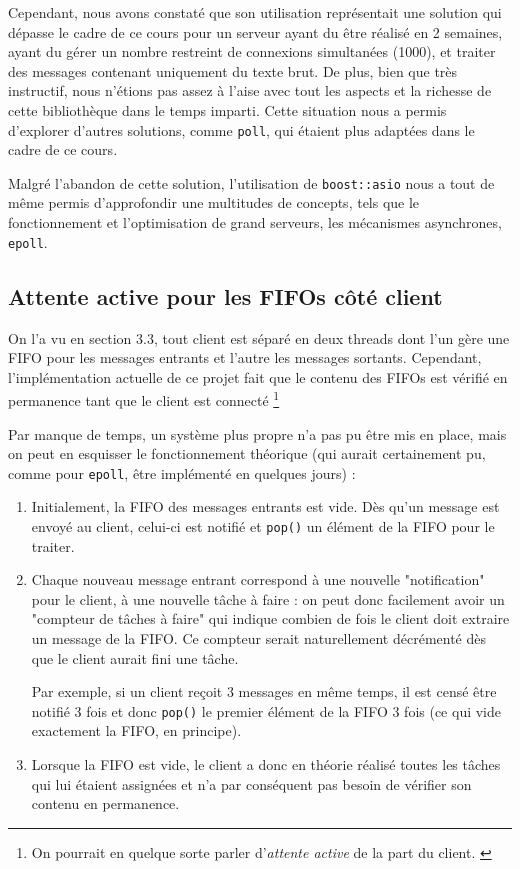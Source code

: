 \documentclass{article}
\begin{document}
\noindent Cependant, nous avons constaté que son utilisation représentait une solution qui dépasse le cadre de ce cours pour un serveur ayant du être réalisé en 2 semaines, ayant du gérer un nombre restreint de connexions simultanées (1000), et traiter des messages contenant uniquement du texte brut. De plus, bien que très instructif, nous n’étions pas assez à l’aise avec tout les aspects et la richesse de cette bibliothèque dans le temps imparti. Cette situation nous a permis d'explorer d’autres solutions, comme \texttt{poll}, qui étaient plus adaptées dans le cadre de ce cours.

\noindent Malgré l'abandon de cette solution, l’utilisation de \texttt{boost::asio} nous a tout de même permis d'approfondir une multitudes de concepts, tels que le fonctionnement et l'optimisation de grand serveurs, les mécanismes asynchrones, \texttt{epoll}.


\subsection{Attente active pour les FIFOs côté client}
\noindent On l'a vu en section 3.3, tout client est séparé en deux threads dont l'un gère une FIFO pour les messages entrants et l'autre les messages sortants. Cependant, l'implémentation actuelle de ce projet fait que le contenu des FIFOs est vérifié en permanence tant que le client est connecté \footnote{On pourrait en quelque sorte parler d'\textit{attente active} de la part du client. \cite{Attente Active} }

\noindent Par manque de temps, un système plus propre n'a pas pu être mis en place, mais on peut en esquisser le fonctionnement théorique (qui aurait certainement pu, comme pour \texttt{epoll}, être implémenté en quelques jours) :
\begin{enumerate}
    \item Initialement, la FIFO des messages entrants est vide. Dès qu'un message est envoyé au client, celui-ci est notifié et \texttt{pop()} un élément de la FIFO pour le traiter.
    \item Chaque nouveau message entrant correspond à une nouvelle "notification" pour le client, à une nouvelle tâche à faire : on peut donc facilement avoir un "compteur de tâches à faire" qui indique combien de fois le client doit extraire un message de la FIFO. Ce compteur serait naturellement décrémenté dès que le client aurait fini une tâche.

    Par exemple, si un client reçoit 3 messages en même temps, il est censé être notifié 3 fois et donc \texttt{pop()} le premier élément de la FIFO 3 fois (ce qui vide exactement la FIFO, en principe).
    \item Lorsque la FIFO est vide, le client a donc en théorie réalisé toutes les tâches qui lui étaient assignées et n'a par conséquent pas besoin de vérifier son contenu en permanence.
\end{enumerate}
\end{document}
